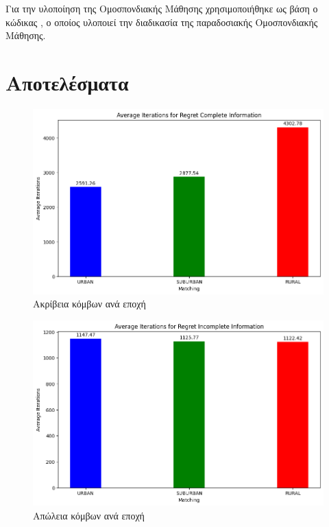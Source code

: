 Για την υλοποίηση της Ομοσπονδιακής Μάθησης χρησιμοποιήθηκε ως βάση ο κώδικας , ο οποίος υλοποιεί την διαδικασία της παραδοσιακής Ομοσπονδιακής Μάθησης.

\newpage

\section{Αποτελέσματα}

\begin{figure}[H]
    \centering
    \includegraphics[width=\textwidth]{figures/chapter4/Average_Iterations_per_area_RCI.png}
    \caption{Ακρίβεια κόμβων ανά εποχή}
    \label{fig1}
\end{figure}

\begin{figure}[H]
    \centering
    \includegraphics[width=\textwidth]{figures/chapter4/Average_Iterations_per_area_RII.png}
    \caption{Απώλεια κόμβων ανά εποχή}
    \label{fig2}
\end{figure}

